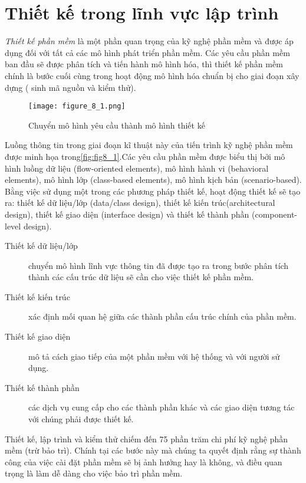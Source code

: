 \documentclass[./../SoftwareEngineering.tex]{subfiles}
\begin{document}
	\section{Thiết kế trong lĩnh vực lập trình}
	\textit{Thiết kế phần mềm } là một phần quan trọng của kỹ nghệ phần mềm và được áp dụng đối với tất cả các mô hình phát triển phần mềm. Các yêu cầu phần mềm ban đầu sẽ được phân tích và tiến hành mô hình hóa, thì thiết kế phần mềm chính là bước cuối cùng trong hoạt động mô hình hóa chuẩn bị cho giai đoạn xây dựng ( sinh mã nguồn và kiểm thử).
	

	
	\begin{figure}[!htb]
		\centering
		\texttt{[image: figure\_8\_1.png]}
		\caption{Chuyển mô hình yêu cầu thành mô hình thiết kế}
		\label{fig:fig8_1}
	\end{figure}
	
	Luồng thông tin trong giai đoạn kĩ thuật này của tiến trình kỹ nghệ phần mềm được minh họa trong\autoref{fig:fig8_1}.Các yêu cầu phần mềm được biểu thị bởi mô hình luồng dữ liệu (flow-oriented elements), mô hình hành vi (behavioral elements), mô hình lớp (class-based elements), mô hình kịch bản (scenario-based). Bằng việc sử dụng một trong các phương pháp thiết kế, hoạt động thiết kế sẽ tạo ra:  thiết kế dữ liệu/lớp (data/class design), thiết kế kiến trúc(architectural design), thiết kế giao diện (interface design) và thiết kế thành phần (component-level design).
	
	

	\begin{description}
		\item[Thiết kế dữ liệu/lớp] chuyển mô hình lĩnh vực thông tin đã được tạo ra trong bước phân tích thành các cấu trúc dữ liệu sẽ cần cho việc thiết kế phần mềm. 
		\item[Thiết kế kiến trúc] xác định mối quan hệ giữa các thành phần cấu trúc chính của phần mềm.
		\item[Thiết kế giao diện] mô tả cách giao tiếp của một phần mềm với hệ thống và với người sử dụng. 
		\item[Thiết kế thành phần] các dịch vụ cung cấp cho các thành phần khác và các giao diện tương tác với chúng phải được thiết kế. 
	\end{description}
	
	
	Thiết kế, lập trình và kiểm thử chiếm đến 75 phần trăm chi phí kỹ nghệ phần mềm (trừ bảo trì). Chính tại các bước này mà chúng ta quyết định rằng sự thành công của việc cài đặt phần mềm sẽ bị ảnh hưởng hay là không, và điều quan trọng là làm dễ dàng cho việc bảo trì phần mềm. 
	
\end{document}
